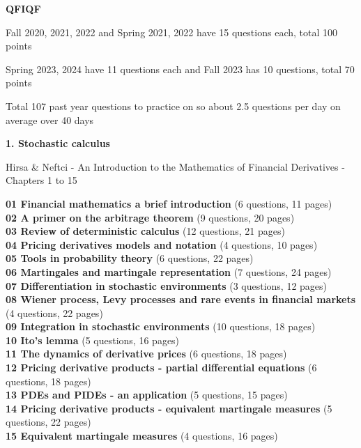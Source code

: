 \documentclass[hidelinks, 12pt]{article}
\theoremstyle{mydefstyle}
\theoremstyle{mythmstyle}
\begin{document}
\newpage

\begin{center}
\textbf{QFIQF}
\end{center}

Fall 2020, 2021, 2022 and Spring 2021, 2022 have 15 questions each, total 100 points

Spring 2023, 2024 have 11 questions each and Fall 2023 has 10 questions, total 70 points

Total 107 past year questions to practice on so about 2.5 questions per day on average over 40 days

\begin{center}
\textbf{1. Stochastic calculus}
\end{center}

Hirsa \& Neftci - An Introduction to the Mathematics of Financial Derivatives - Chapters 1 to 15

\textbf{01 Financial mathematics a brief introduction} (6 questions, 11 pages) \\
\textbf{02 A primer on the arbitrage theorem} (9 questions, 20 pages) \\
\textbf{03 Review of deterministic calculus} (12 questions, 21 pages) \\
\textbf{04 Pricing derivatives models and notation} (4 questions, 10 pages) \\
\textbf{05 Tools in probability theory} (6 questions, 22 pages) \\
\textbf{06 Martingales and martingale representation} (7 questions, 24 pages) \\
\textbf{07 Differentiation in stochastic environments} (3 questions, 12 pages) \\
\textbf{08 Wiener process, Levy processes and rare events in financial markets} (4 questions, 22 pages) \\
\textbf{09 Integration in stochastic environments} (10 questions, 18 pages) \\
\textbf{10 Ito's lemma} (5 questions, 16 pages) \\

\textbf{11 The dynamics of derivative prices} (6 questions, 18 pages) \\
\textbf{12 Pricing derivative products - partial differential equations} (6 questions, 18 pages) \\
\textbf{13 PDEs and PIDEs - an application} (5 questions, 15 pages) \\
\textbf{14 Pricing derivative products - equivalent martingale measures} (5 questions, 22 pages) \\
\textbf{15 Equivalent martingale measures} (4 questions, 16 pages) \\
\end{document}
